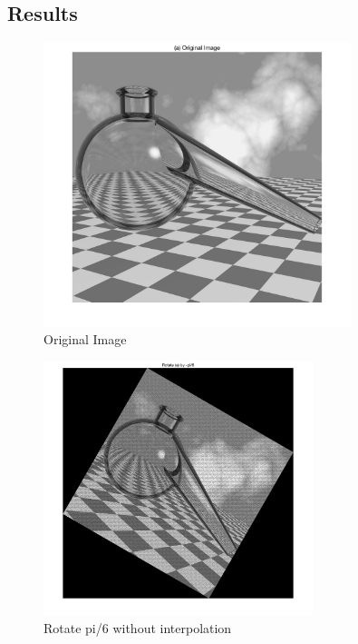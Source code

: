 \documentclass[11pt,oneside]{book}
\begin{document}
\subsection{Results}
\begin{figure}[!htb]
   \centering  
   \includegraphics[width=0.8\textwidth]{images/6/rotate.jpg}
   \caption{Original Image}
\end{figure}
\newpage
\begin{figure}[!htb]
   \centering  
   \includegraphics[width=0.7\textwidth]{images/6/rotate_pi.jpg}
   \caption{Rotate pi/6 without interpolation}
\end{figure}
\end{document}
